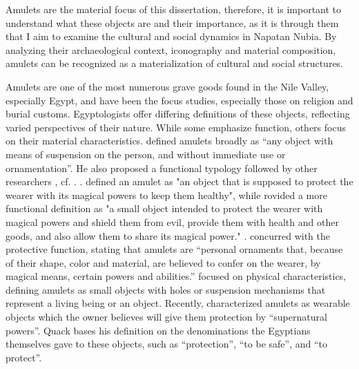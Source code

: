 Amulets are the material focus of this dissertation, therefore, it is important to understand what these objects are and their importance, as it is through them that I aim to examine the cultural and social dynamics in Napatan Nubia. By analyzing their archaeological context, iconography and material composition, amulets can be recognized as a materialization of cultural and social structures.


Amulets are one of the most numerous grave goods found in the Nile Valley, especially Egypt, and have been the focus studies, especially those on religion and burial customs. Egyptologists offer differing definitions of these objects, reflecting varied perspectives of their nature. While some emphasize function, others focus on their material characteristics. \textcites[p.~6]{petrieAmulets1914} defined amulets broadly as “any object with means of suspension on the person, and without immediate use or ornamentation”. He also proposed a functional typology followed by other researchers \parencites{andrewsAmuletsAncientEgypt1994}, cf. \parencites[p.~17]{müller-winklerÄgyptischenObjektAmuletteMit1987}. \textcite[p.~20]{müller-winklerÄgyptischenObjektAmuletteMit1987}. defined an amulet as "an object that is supposed to protect the wearer with its magical powers to keep them healthy", while \textcites[p.~2]{herrmannÄgyptischenAmuletteSammlungen2003} rovided a more functional definition as "a small object intended to protect the wearer with magical powers and shield them from evil, provide them with health and other goods, and also allow them to share its magical power." \textcites[p.~6]{andrewsAmuletsAncientEgypt1994}. concurred with the protective function, stating that amulets are “personal ornaments that, because of their shape, color and material, are believed to confer on the wearer, by magical means, certain powers and abilities.” \textcites[p.~19]{dubielAnthropomorpheAmuletteGrabern2004} focused on physical characteristics, defining amulets as small objects with holes or suspension mechanisms that represent a living being or an object. Recently, \textcite[p.~1-4]{quackAltägyptischeAmuletteUnd2022} characterized amulets as wearable objects which the owner believes will give them protection by “supernatural powers”. Quack bases his definition on the denominations the Egyptians themselves gave to these objects, such as “protection”, “to be safe”,  and “to protect”.


